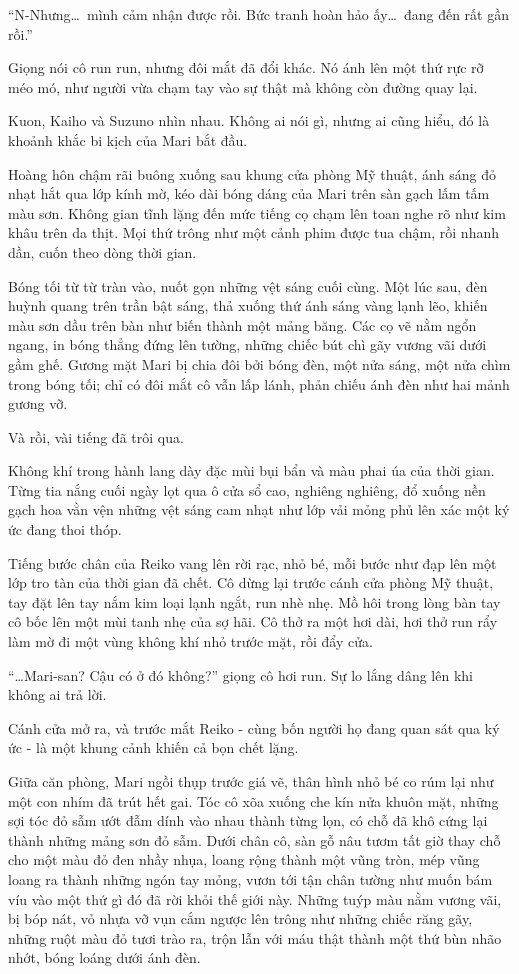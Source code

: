 \documentclass[../main.tex]{subfiles}
\begin{document}
``N-Nhưng\dots\ mình cảm nhận được rồi. Bức tranh hoàn hảo ấy\dots\ đang đến rất gần rồi.''

Giọng nói cô run run, nhưng đôi mắt đã đổi khác. Nó ánh lên một thứ rực rỡ méo mó, như người vừa chạm tay vào sự thật mà không còn đường quay lại.


Kuon, Kaiho và Suzuno nhìn nhau. Không ai nói gì, nhưng ai cũng hiểu, đó là khoảnh khắc bi kịch của Mari bắt đầu.

\ct

Hoàng hôn chậm rãi buông xuống sau khung cửa phòng Mỹ thuật, ánh sáng đỏ nhạt hắt qua lớp kính mờ, kéo dài bóng dáng của Mari trên sàn gạch lấm tấm màu sơn. Không gian tĩnh lặng đến mức tiếng cọ chạm lên toan nghe rõ như kim khâu trên da thịt. Mọi thứ trông như một cảnh phim được tua chậm, rồi nhanh dần, cuốn theo dòng thời gian.

Bóng tối từ từ tràn vào, nuốt gọn những vệt sáng cuối cùng. Một lúc sau, đèn huỳnh quang trên trần bật sáng, thả xuống thứ ánh sáng vàng lạnh lẽo, khiến màu sơn dầu trên bàn như biến thành một mảng băng. Các cọ vẽ nằm ngổn ngang, in bóng thẳng đứng lên tường, những chiếc bút chì gãy vương vãi dưới gầm ghế. Gương mặt Mari bị chia đôi bởi bóng đèn, một nửa sáng, một nửa chìm trong bóng tối; chỉ có đôi mắt cô vẫn lấp lánh, phản chiếu ánh đèn như hai mảnh gương vỡ.

Và rồi, vài tiếng đã trôi qua.

Không khí trong hành lang dày đặc mùi bụi bẩn và màu phai úa của thời gian. Từng tia nắng cuối ngày lọt qua ô cửa sổ cao, nghiêng nghiêng, đổ xuống nền gạch hoa vằn vện những vệt sáng cam nhạt như lớp vải mỏng phủ lên xác một ký ức đang thoi thóp.

Tiếng bước chân của Reiko vang lên rời rạc, nhỏ bé, mỗi bước như đạp lên một lớp tro tàn của thời gian đã chết. Cô dừng lại trước cánh cửa phòng Mỹ thuật, tay đặt lên tay nắm kim loại lạnh ngắt, run nhè nhẹ. Mồ hôi trong lòng bàn tay cô bốc lên một mùi tanh nhẹ của sợ hãi. Cô thở ra một hơi dài, hơi thở run rẩy làm mờ đi một vùng không khí nhỏ trước mặt, rồi đẩy cửa.

``\dots Mari-san? Cậu có ở đó không?'' giọng cô hơi run. Sự lo lắng dâng lên khi không ai trả lời.

Cánh cửa mở ra, và trước mắt Reiko - cùng bốn người họ đang quan sát qua ký ức - là một khung cảnh khiến cả bọn chết lặng.

Giữa căn phòng, Mari ngồi thụp trước giá vẽ, thân hình nhỏ bé co rúm lại như một con nhím đã trút hết gai. Tóc cô xõa xuống che kín nửa khuôn mặt, những sợi tóc đỏ sẫm ướt đẫm dính vào nhau thành từng lọn, có chỗ đã khô cứng lại thành những mảng sơn đỏ sẫm. Dưới chân cô, sàn gỗ nâu tươm tất giờ thay chỗ cho một màu đỏ đen nhầy nhụa, loang rộng thành một vũng tròn, mép vũng loang ra thành những ngón tay mỏng, vươn tới tận chân tường như muốn bám víu vào một thứ gì đó đã rời khỏi thế giới này. Những tuýp màu nằm vương vãi, bị bóp nát, vỏ nhựa vỡ vụn cắm ngược lên trông như những chiếc răng gãy, những ruột màu đỏ tươi trào ra, trộn lẫn với máu thật thành một thứ bùn nhão nhớt, bóng loáng dưới ánh đèn.
\end{document}
